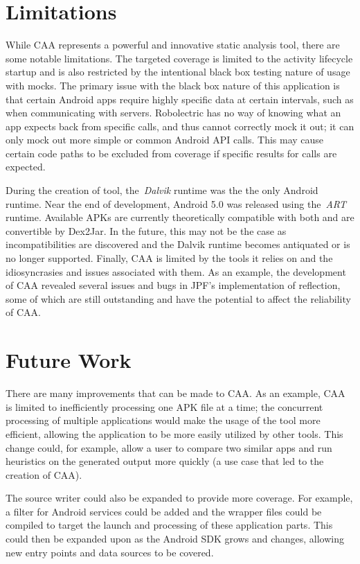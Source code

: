 \documentclass{sig-alternate}
\begin{document}
\section{Limitations}
\label{sec: limitations}

While CAA represents a powerful and innovative static analysis tool, there are some notable limitations. The targeted coverage is limited to the activity lifecycle startup and is also restricted by the intentional black box testing nature of usage with mocks. The primary issue with the black box nature of this application is that certain Android apps require highly specific data at certain intervals, such as when communicating with servers. Robolectric has no way of knowing what an app expects back from specific calls, and thus cannot correctly mock it out; it can only mock out more simple or common Android API calls. This may cause certain code paths to be excluded from coverage if specific results for calls are expected.

During the creation of tool, the~\emph{Dalvik} runtime was the the only Android runtime. Near the end of development, Android 5.0 was released using the~\emph{ART} runtime. Available APKs are currently theoretically compatible with both and are convertible by Dex2Jar. In the future, this may not be the case as incompatibilities are discovered and the Dalvik runtime becomes antiquated or is no longer supported. Finally, CAA is limited by the tools it relies on and the idiosyncrasies and issues associated with them. As an example, the development of CAA revealed several issues and bugs in JPF's implementation of reflection, some of which are still outstanding and have the potential to affect the reliability of CAA.


\section{Future Work}
\label{sec: futurework}

There are many improvements that can be made to CAA. As an example, CAA is limited to inefficiently processing one APK file at a time; the concurrent processing of multiple applications would make the usage of the tool more efficient, allowing the application to be more easily utilized by other tools. This change could, for example, allow a user to compare two similar apps and run heuristics on the generated output more quickly (a use case that led to the creation of CAA).

The source writer could also be expanded to provide more coverage. For example, a filter for Android services could be added and the wrapper files could be compiled to target the launch and processing of these application parts. This could then be expanded upon as the Android SDK grows and changes, allowing new entry points and data sources to be covered.
\end{document}
